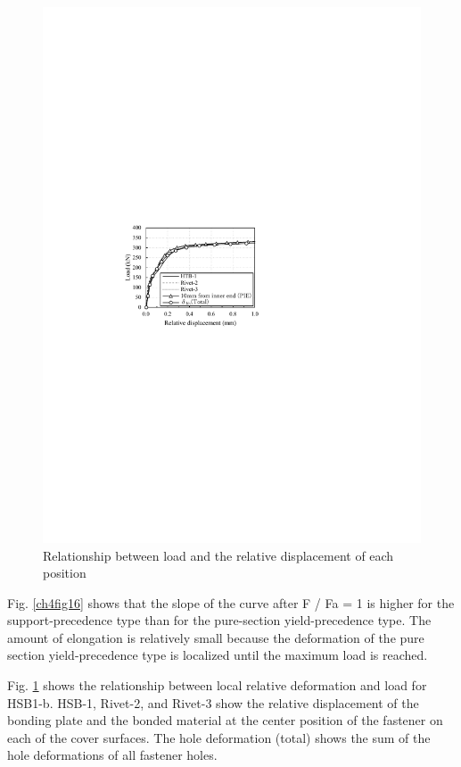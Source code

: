 \begin{figure}[htbp]
\begin{minipage}[t]{0.48\textwidth}
    \includegraphics[width=\linewidth]{imgs/ch4/fig17.pdf}
    \caption{Relationship between load and the relative displacement of each position}
    \label{ch4fig17}
    \end{minipage}
\end{figure}

Fig. \ref{ch4fig16} shows that the slope of the curve after F / Fa = 1 is higher for the support-precedence type than for the pure-section yield-precedence type. The amount of elongation is relatively small because the deformation of the pure section yield-precedence type is localized until the maximum load is reached.

Fig. \ref{ch4fig17} shows the relationship between local relative deformation and load for HSB1-b. HSB-1, Rivet-2, and Rivet-3 show the relative displacement of the bonding plate and the bonded material at the center position of the fastener on each of the cover surfaces. The hole deformation (total) shows the sum of the hole deformations of all fastener holes.

